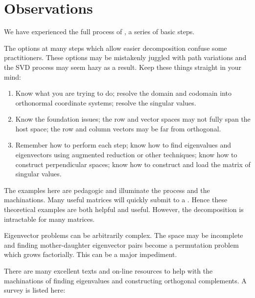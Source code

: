 \section{Observations}
We have experienced the full process of \svdl, a series of basic steps. 

The options at many steps which allow easier decomposition confuse some practitioners. These options may be mistakenly juggled with path variations and the SVD process may seem hazy as a result. Keep these things straight in your mind:
\begin{enumerate}
\item Know what you are trying to do;
\subitem resolve the domain and codomain into orthonormal coordinate systems;
\subitem resolve the singular values.
\item Know the foundation issues;
\subitem the row and vector spaces may not fully span the host space;
\subitem the row and column vectors may be far from orthogonal.
\item Remember how to perform each step;
\subitem know how to find eigenvalues and eigenvectors using augmented reduction or other techniques;
\subitem know how to construct perpendicular spaces;
\subitem know how to construct and load the matrix of singular values.
\end{enumerate}

The examples here are pedagogic and illuminate the process and the machinations. Many useful matrices will quickly submit to a \svdl. Hence these theoretical examples are both helpful and useful. However, the decomposition is intractable for many matrices.

Eigenvector problems can be arbitrarily complex. The space may be incomplete and finding mother-daughter eigenvector pairs become a permutation problem which grows factorially. This can be a major impediment.

There are many excellent texts and on-line resources to help with the machinations of finding eigenvalues and constructing orthogonal complements. A survey is listed here:

\begin{table}[htdp]
\begin{center}
\end{center}
\label{default}
\caption{Resources to help with facets of the \svdl.}
\end{table}


\endinput